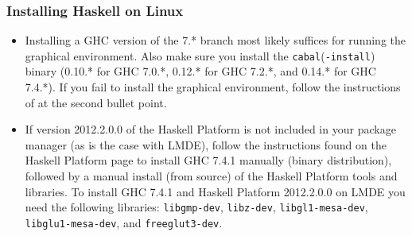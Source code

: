 \documentclass[]{article}
\begin{document}
\subsubsection{Installing Haskell on Linux}
\begin{itemize}
  \item Installing a GHC version of the 7.* branch most likely suffices for running the graphical environment. Also make sure you install the \texttt{cabal}(\texttt{-install}) binary (0.10.* for GHC 7.0.*, 0.12.* for GHC 7.2.*, and 0.14.* for GHC 7.4.*). If you fail to install the graphical environment, follow the instructions of at the second bullet point.
  \item If version 2012.2.0.0 of the Haskell Platform is not included in your package manager (as is the case with LMDE), follow the instructions found on the Haskell Platform page to install GHC 7.4.1 manually (binary distribution), followed by a manual install (from source) of the Haskell Platform tools and libraries.
  To install GHC 7.4.1 and Haskell Platform 2012.2.0.0 on LMDE you need the following libraries: \texttt{libgmp-dev}, \texttt{libz-dev}, \texttt{libgl1-mesa-dev}, \texttt{libglu1-mesa-dev}, and \texttt{freeglut3-dev}.
\end{itemize}
\end{document}
